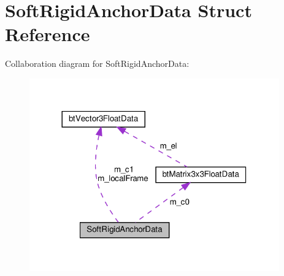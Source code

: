 \hypertarget{structSoftRigidAnchorData}{}\section{Soft\+Rigid\+Anchor\+Data Struct Reference}
\label{structSoftRigidAnchorData}


Collaboration diagram for Soft\+Rigid\+Anchor\+Data\+:
\nopagebreak
\begin{figure}[H]
\begin{center}
\leavevmode
\includegraphics[width=305pt]{structSoftRigidAnchorData__coll__graph}
\end{center}
\end{figure}
